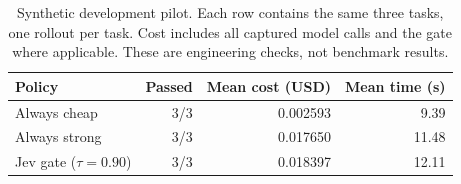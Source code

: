 \begin{table}[t]
\centering
\caption{Synthetic development pilot. Each row contains the same three tasks, one rollout per task. Cost includes all captured model calls and the gate where applicable. These are engineering checks, not benchmark results.}
\label{tab:pilot}
\begin{tabular}{lrrr}
\toprule
Policy & Passed & Mean cost (USD) & Mean time (s) \\
\midrule
Always cheap & 3/3 & 0.002593 & 9.39 \\
Always strong & 3/3 & 0.017650 & 11.48 \\
Jev gate ($\tau=0.90$) & 3/3 & 0.018397 & 12.11 \\
\bottomrule
\end{tabular}
\end{table}
